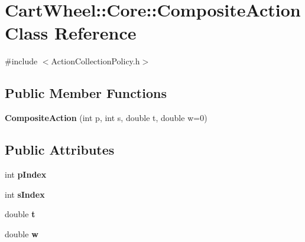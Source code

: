 \hypertarget{classCartWheel_1_1Core_1_1CompositeAction}{
\section{CartWheel::Core::CompositeAction Class Reference}
\label{classCartWheel_1_1Core_1_1CompositeAction}
}


{\ttfamily \#include $<$ActionCollectionPolicy.h$>$}

\subsection*{Public Member Functions}
\begin{DoxyCompactItemize}
\item 
\hypertarget{classCartWheel_1_1Core_1_1CompositeAction_af551e26ef8906f67e3fad9d1560e3b87}{
{\bfseries CompositeAction} (int p, int s, double t, double w=0)}
\label{classCartWheel_1_1Core_1_1CompositeAction_af551e26ef8906f67e3fad9d1560e3b87}

\end{DoxyCompactItemize}
\subsection*{Public Attributes}
\begin{DoxyCompactItemize}
\item 
\hypertarget{classCartWheel_1_1Core_1_1CompositeAction_a727f0b7eae30e5b926ded7169bf409d1}{
int {\bfseries pIndex}}
\label{classCartWheel_1_1Core_1_1CompositeAction_a727f0b7eae30e5b926ded7169bf409d1}

\item 
\hypertarget{classCartWheel_1_1Core_1_1CompositeAction_a078d400026d451060d31fa1dceca5183}{
int {\bfseries sIndex}}
\label{classCartWheel_1_1Core_1_1CompositeAction_a078d400026d451060d31fa1dceca5183}

\item 
\hypertarget{classCartWheel_1_1Core_1_1CompositeAction_acf4cc90f84cba46f7357be8d37d6a1a4}{
double {\bfseries t}}
\label{classCartWheel_1_1Core_1_1CompositeAction_acf4cc90f84cba46f7357be8d37d6a1a4}

\item 
\hypertarget{classCartWheel_1_1Core_1_1CompositeAction_ad4c409c66a445fc797c706fc18bc4851}{
double {\bfseries w}}
\label{classCartWheel_1_1Core_1_1CompositeAction_ad4c409c66a445fc797c706fc18bc4851}

\end{DoxyCompactItemize}


